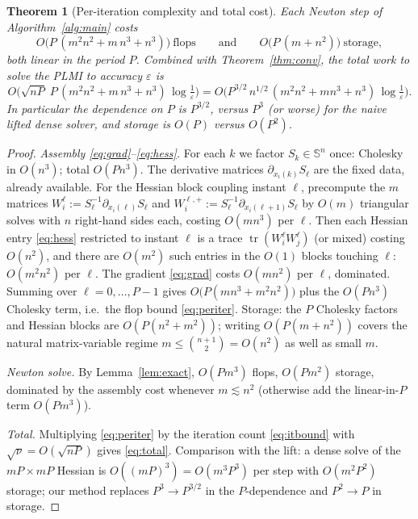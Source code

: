 \documentclass{amsart}
\newtheorem{theorem}{Theorem}
\newcommand{\Sym}{\mathbb{S}}
\newcommand{\tr}{\operatorname{tr}}
\begin{document}
\begin{theorem}[Per-iteration complexity and total cost]\label{thm:cost}
Each Newton step of Algorithm~\ref{alg:main} costs
\begin{equation}\label{eq:periter}
  O\!\big(P\,(m^2 n^2 + m\,n^3 + n^3)\big)\ \text{flops}
  \qquad\text{and}\qquad
  O\!\big(P\,(m+n^2)\big)\ \text{storage},
\end{equation}
both \emph{linear} in the period $P$. Combined with Theorem~\ref{thm:conv}, the total
work to solve the PLMI to accuracy $\varepsilon$ is
\begin{equation}\label{eq:total}
  O\!\Big(\sqrt{nP}\;P\,(m^2n^2+m\,n^3+n^3)\,\log\tfrac1\varepsilon\Big)
  = O\!\Big(P^{3/2}\,n^{1/2}\,(m^2n^2+mn^3+n^3)\,\log\tfrac1\varepsilon\Big).
\end{equation}
In particular the dependence on $P$ is $P^{3/2}$, versus $P^{3}$ (or worse) for the
naive lifted dense solver, and storage is $O(P)$ versus $O(P^2)$.
\end{theorem}

\begin{proof}
\emph{Assembly \eqref{eq:grad}--\eqref{eq:hess}.} For each $k$ we factor
$S_k\in\Sym^n$ once: Cholesky in $O(n^3)$; total $O(Pn^3)$. The derivative matrices
$\partial_{x_i(k)}S_\ell$ are the fixed data, already available. For the Hessian
block coupling instant $\ell$, precompute the $m$ matrices
$W_i^\ell:=S_\ell^{-1}\partial_{x_i(\ell)}S_\ell$ and
$W_i^{\ell,+}:=S_\ell^{-1}\partial_{x_i(\ell+1)}S_\ell$ by $O(m)$ triangular solves
with $n$ right-hand sides each, costing $O(mn^3)$ per $\ell$. Then each Hessian
entry \eqref{eq:hess} restricted to instant $\ell$ is a trace
$\tr(W_i^\ell W_j^\ell)$ (or mixed) costing $O(n^2)$, and there are $O(m^2)$ such
entries in the $O(1)$ blocks touching $\ell$: $O(m^2n^2)$ per $\ell$. The gradient
\eqref{eq:grad} costs $O(mn^2)$ per $\ell$, dominated. Summing over
$\ell=0,\dots,P-1$ gives $O\!\big(P(mn^3+m^2n^2)\big)$ plus the $O(Pn^3)$ Cholesky
term, i.e.\ the flop bound \eqref{eq:periter}. Storage: the $P$ Cholesky factors and
Hessian blocks are $O(P(n^2+m^2))$; writing $O(P(m+n^2))$ covers the natural
matrix-variable regime $m\le\binom{n+1}{2}=O(n^2)$ as well as small $m$.

\emph{Newton solve.} By Lemma~\ref{lem:exact}, $O(Pm^3)$ flops, $O(Pm^2)$ storage,
dominated by the assembly cost whenever $m\lesssim n^2$ (otherwise add the linear-in-$P$
term $O(Pm^3)$).

\emph{Total.} Multiplying \eqref{eq:periter} by the iteration count \eqref{eq:itbound}
with $\sqrt\nu=O(\sqrt{nP})$ gives \eqref{eq:total}. Comparison with the lift: a
dense solve of the $mP\times mP$ Hessian is $O((mP)^3)=O(m^3P^3)$ per step with
$O(m^2P^2)$ storage; our method replaces $P^3\to P^{3/2}$ in the $P$-dependence and
$P^2\to P$ in storage.
\end{proof}
\end{document}
